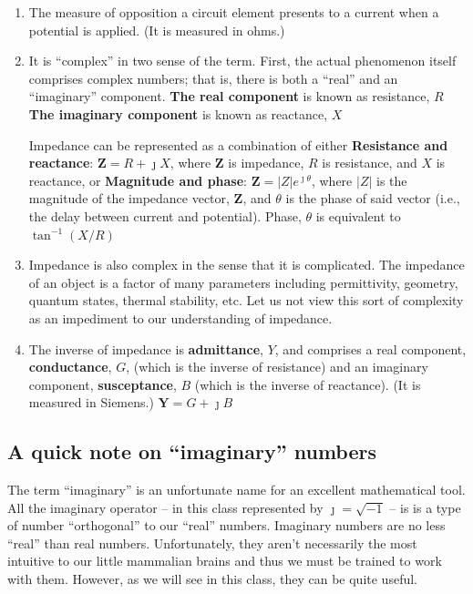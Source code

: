 \documentclass[11pt]{book}
\begin{document}
\begin{enumerate}
	\item The measure of opposition a circuit element presents to a current when a potential is applied. (It is measured in ohms.)
	\item It is ``complex'' in two sense of the term. First, the actual phenomenon itself comprises complex numbers; that is, there is both a ``real'' and an ``imaginary'' component.
	\subitem \textbf{The real component} is known as resistance, $R$
	\subitem \textbf{The imaginary component} is known as reactance, $X$
	
	Impedance can be represented as a combination of either
	\subitem \textbf{Resistance and reactance}: $\mathbf{Z} = R + \jmath X$, where $\mathbf{Z}$ is impedance, $R$ is resistance, and $X$ is reactance, or
	\subitem \textbf{Magnitude and phase}: $\mathbf{Z} = |Z|e^{\jmath \theta}$, where $|Z|$ is the magnitude of the impedance vector, $\mathbf{Z}$, and $\theta$ is the phase of said vector (i.e., the delay between current and potential). Phase, $\theta$ is equivalent to $\tan^{-1}(X/R)$
	\item Impedance is also complex in the sense that it is complicated. The impedance of an object is a factor of many parameters including permittivity, geometry, quantum states, thermal stability, etc. Let us not view this sort of complexity as an impediment to our understanding of impedance.
	\item The inverse of impedance is \textbf{admittance}, $Y$, and comprises a real component, \textbf{conductance}, $G$, (which is the inverse of resistance) and an imaginary component, \textbf{susceptance}, $B$ (which is the inverse of reactance). (It is measured in Siemens.)
	\subitem $\mathbf{Y} = G + \jmath B$
\end{enumerate}

\subsection{A quick note on ``imaginary'' numbers}
The term ``imaginary'' is an unfortunate name for an excellent mathematical tool. All the imaginary operator -- in this class represented by $\jmath = \sqrt{-1}$ -- is is a type of number ``orthogonal'' to our ``real'' numbers. Imaginary numbers are no less ``real'' than real numbers. Unfortunately, they aren't necessarily the most intuitive to our little mammalian brains and thus we must be trained to work with them. However, as we will see in this class, they can be quite useful.
\end{document}
